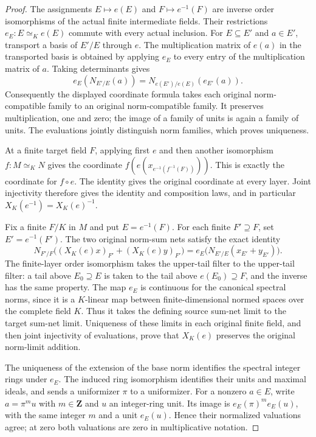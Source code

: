 \begin{proof}
The assignments $E\mapsto e(E)$ and $F\mapsto e^{-1}(F)$ are inverse
order isomorphisms of the actual finite intermediate fields. Their
restrictions $e_E:E\simeq_K e(E)$ commute with every actual inclusion.
For $E\subseteq E'$ and $a\in E'$, transport a basis of $E'/E$
through $e$. The multiplication matrix of $e(a)$ in the transported
basis is obtained by applying $e_E$ to every entry of the multiplication
matrix of $a$. Taking determinants gives
\[
 e_E(N_{E'/E}(a))=N_{e(E')/e(E)}(e_{E'}(a)).
\]
Consequently the displayed coordinate formula takes each original
norm-compatible family to an original norm-compatible family. It
preserves multiplication, one and zero; the image of a family of units
is again a family of units. The evaluations jointly distinguish norm
families, which proves uniqueness.

At a finite target field $F$, applying first $e$ and then another
isomorphism $f:M\simeq_K N$ gives the coordinate
$f(e(x_{e^{-1}(f^{-1}(F))}))$. This is exactly the coordinate for
$f\circ e$. The identity gives the original coordinate at every layer.
Joint injectivity therefore gives the identity and composition laws,
and in particular $X_K(e^{-1})=X_K(e)^{-1}$.

Fix a finite $F/K$ in $M$ and put $E=e^{-1}(F)$.
For each finite $F'\supseteq F$, set $E'=e^{-1}(F')$.
The two original norm-sum nets satisfy the exact identity
\[
 N_{F'/F}\bigl((X_K(e)x)_{F'}+(X_K(e)y)_{F'}\bigr)
   =e_E\bigl(N_{E'/E}(x_{E'}+y_{E'})\bigr).
\]
The finite-layer order isomorphism takes the upper-tail filter to the
upper-tail filter: a tail above $E_0\supseteq E$ is taken to the tail
above $e(E_0)\supseteq F$, and the inverse has the same property.
The map $e_E$ is continuous for the canonical spectral norms, since
it is a $K$-linear map between finite-dimensional normed spaces over
the complete field $K$. Thus it takes the defining source sum-net
limit to the target sum-net limit. Uniqueness of these limits in
each original finite field, and then joint injectivity of evaluations,
prove that $X_K(e)$ preserves the original norm-limit addition.

The uniqueness of the extension of the base norm identifies the
spectral integer rings under $e_E$. The induced ring isomorphism
identifies their units and maximal ideals, and sends a uniformizer
$\pi$ to a uniformizer. For a nonzero $a\in E$, write
$a=\pi^m u$ with $m\in\mathbf Z$ and $u$ an integer-ring unit.
Its image is $e_E(\pi)^m e_E(u)$, with the same integer $m$ and a
unit $e_E(u)$. Hence their normalized valuations agree; at zero
both valuations are zero in multiplicative notation.


\end{proof}
